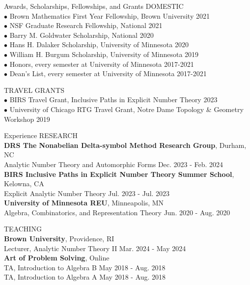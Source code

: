 \documentclass{resume} %
\begin{document}
\begin{rSection}{Awards, Scholarships, Fellowships, and Grants}
    DOMESTIC \\
    {$\bullet$ Brown Mathematics First Year Fellowship, Brown University} \hfill {2021} \\
    {$\bullet$ NSF Graduate Research Fellowship, National} \hfill {2021} \\
    {$\bullet$ Barry M. Goldwater Scholarship, National} \hfill {2020} \\
    {$\bullet$ Hans H. Dalaker Scholarship, University of Minnesota} \hfill {2020} \\
    {$\bullet$ William H. Burgum Scholarship, University of Minnesota} \hfill {2019} \\
    {$\bullet$ Honors, every semester at University of Minnesota} \hfill {2017-2021} \\
    {$\bullet$ Dean's List, every semester at University of Minnesota} \hfill {2017-2021}

    TRAVEL GRANTS \\
    {$\bullet$ BIRS Travel Grant, Inclusive Paths in Explicit Number Theory} \hfill {2023} \\
    {$\bullet$ University of Chicago RTG Travel Grant, Notre Dame Topology \& Geometry Workshop} \hfill {2019} 
\end{rSection}

\begin{rSection}{Experience}
    RESEARCH \\
    {\bf DRS The Nonabelian Delta-symbol Method Research Group}, Durham, NC \\
    \hphantom{\quad} Analytic Number Theory and Automorphic Forms \hfill {Dec. 2023 - Feb. 2024} \\
    {\bf BIRS Inclusive Paths in Explicit Number Theory Summer School}, Kelowna, CA \\
    \hphantom{\quad} Explicit Analytic Number Theory \hfill {Jul. 2023 - Jul. 2023} \\
    {\bf University of Minnesota REU}, Minneapolis, MN \\
    \hphantom{\quad} Algebra, Combinatorics, and Representation Theory \hfill {Jun. 2020 - Aug. 2020}

    TEACHING \\
    {\bf Brown University}, Providence, RI \\
    \hphantom{\quad} Lecturer, Analytic Number Theory II \hfill {Mar. 2024 - May 2024} \\
    {\bf Art of Problem Solving}, Online \\
    \hphantom{\quad} TA, Introduction to Algebra B \hfill {May 2018 - Aug. 2018} \\
    \hphantom{\quad} TA, Introduction to Algebra A \hfill {May 2018 - Aug. 2018} \\
\end{rSection}
\end{document}
